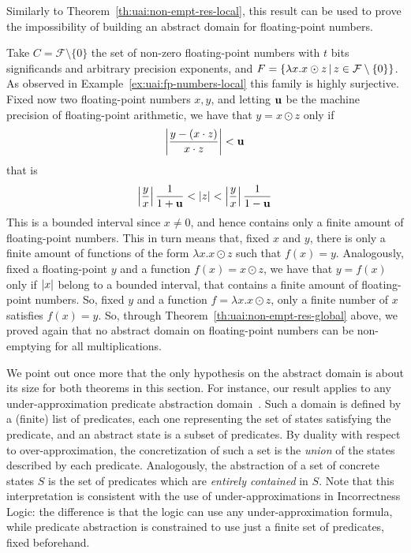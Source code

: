 Similarly to Theorem~\ref{th:uai:non-empt-res-local}, this result can be used to prove the impossibility of building an abstract domain for floating-point numbers.
\begin{example}\label{ex:uai:fp-numbers-global}
	Take $C = \mathcal{F} \setminus \{ 0 \}$ the set of non-zero floating-point numbers with $t$ bits significands and arbitrary precision exponents, and $F = \{ \lambda x . x \odot z \,\vert\, z \in \mathcal{F} \setminus \{ 0 \} \}$.
	As observed in Example~\ref{ex:uai:fp-numbers-local} this family is highly surjective.
	Fixed now two floating-point numbers $x, y$, and letting $\textbf{u}$ be the machine precision of floating-point arithmetic, we have that $y = x \odot z$ only if
	\[
	\left\lvert \frac{y - (x \cdot z)}{x \cdot z} \right\rvert < \textbf{u}
	\]
	that is
	\[
	\left\lvert\frac{y}{x}\right\rvert \frac{1}{1+\textbf{u}} < \lvert z\rvert < \left\lvert\frac{y}{x}\right\rvert \frac{1}{1-\textbf{u}}
	\]
	This is a bounded interval since $x \neq 0$, and hence contains only a finite amount of floating-point numbers. This in turn means that, fixed $x$ and $y$, there is only a finite amount of functions of the form $\lambda x. x \odot z$ such that $f(x) = y$.
	Analogously, fixed a floating-point $y$ and a function $f(x) = x \odot z$, we have that $y = f(x)$ only if $\lvert x\rvert$ belong to a bounded interval, that contains a finite amount of floating-point numbers. So, fixed $y$ and a function $f = \lambda x . x \odot z$, only a finite number of $x$ satisfies $f(x) = y$.
	So, through Theorem~\ref{th:uai:non-empt-res-global} above, we proved again that no abstract domain on floating-point numbers can be non-emptying for all multiplications.
\end{example}

We point out once more that the only hypothesis on the abstract domain is about its size for both theorems in this section. For instance, our result applies to any under-approximation predicate abstraction domain~\cite{GS97}. Such a domain is defined by a (finite) list of predicates, each one representing the set of states satisfying the predicate, and an abstract state is a subset of predicates. By duality with respect to over-approximation, the concretization of such a set is the \emph{union} of the states described by each predicate. Analogously, the abstraction of a set of concrete states $S$ is the set of predicates which are \emph{entirely contained} in $S$. Note that this interpretation is consistent with the use of under-approximations in Incorrectness Logic: the difference is that the logic can use any under-approximation formula, while predicate abstraction is constrained to use just a finite set of predicates, fixed beforehand.

